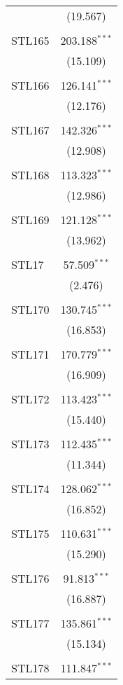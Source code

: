 \begin{table}[!htbp]
\begin{tabular}{@{\extracolsep{5pt}}lc}
  & (19.567) \\ 
  & \\ 
 STL165 & 203.188$^{***}$ \\ 
  & (15.109) \\ 
  & \\ 
 STL166 & 126.141$^{***}$ \\ 
  & (12.176) \\ 
  & \\ 
 STL167 & 142.326$^{***}$ \\ 
  & (12.908) \\ 
  & \\ 
 STL168 & 113.323$^{***}$ \\ 
  & (12.986) \\ 
  & \\ 
 STL169 & 121.128$^{***}$ \\ 
  & (13.962) \\ 
  & \\ 
 STL17 & 57.509$^{***}$ \\ 
  & (2.476) \\ 
  & \\ 
 STL170 & 130.745$^{***}$ \\ 
  & (16.853) \\ 
  & \\ 
 STL171 & 170.779$^{***}$ \\ 
  & (16.909) \\ 
  & \\ 
 STL172 & 113.423$^{***}$ \\ 
  & (15.440) \\ 
  & \\ 
 STL173 & 112.435$^{***}$ \\ 
  & (11.344) \\ 
  & \\ 
 STL174 & 128.062$^{***}$ \\ 
  & (16.852) \\ 
  & \\ 
 STL175 & 110.631$^{***}$ \\ 
  & (15.290) \\ 
  & \\ 
 STL176 & 91.813$^{***}$ \\ 
  & (16.887) \\ 
  & \\ 
 STL177 & 135.861$^{***}$ \\ 
  & (15.134) \\ 
  & \\ 
 STL178 & 111.847$^{***}$ \\ 

\end{tabular}
\end{table}
